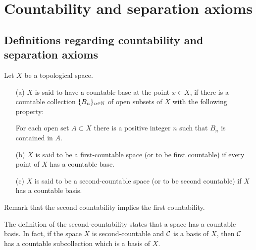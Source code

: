 \section{Countability and separation axioms}

\subsection{Definitions regarding countability and separation axioms}
\begin{defi}
    Let $X$ be a topological space.
    \begin{enumerate}
        \item[(a)] $X$ is said to have a countable base at the point $x\in X$, if there is a countable collection $\{B_n\}_{n\in{\mathbb{N}}}$ of open subsets of $X$ with the following property:
            \begin{center}
                For each open set $A\subset X$ there is a positive integer $n$ such that $B_n$ is contained in $A$.
            \end{center}
        \item[(b)] $X$ is said to be a first-countable space (or to be first countable) if every point of $X$ has a countable base.
        \item[(c)] $X$ is said to be a second-countable space (or to be second countable) if $X$ has a countable basis.
    \end{enumerate}
    Remark that the second countability implies the first countability.
\end{defi}
\begin{rmk}
    The definition of the second-countability states that a space has a countable basis.
    In fact, if the space $X$ is second-countable and ${\mathcal{C}}$ is a basis of $X$, then ${\mathcal{C}}$ has a countable subcollection which is a basis of $X$.
\end{rmk}
